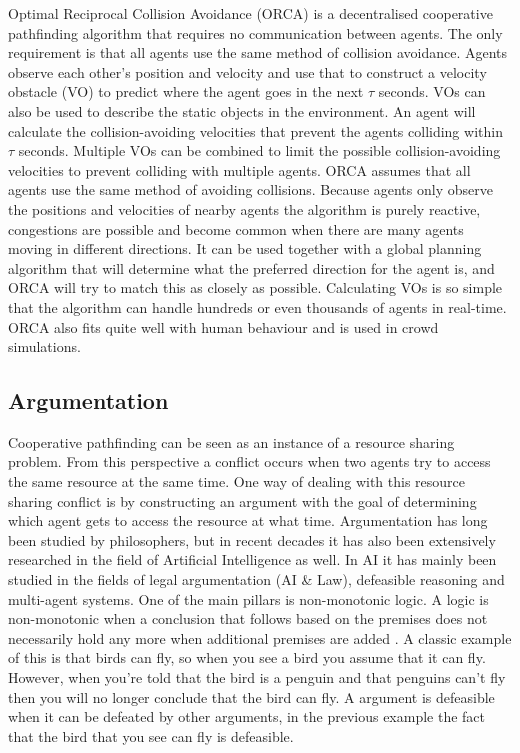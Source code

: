 Optimal Reciprocal Collision Avoidance (ORCA) \cite{vandenberg2011} is a
decentralised cooperative pathfinding algorithm that requires no communication
between agents. The only requirement is that all agents use the same method of
collision avoidance. Agents observe each other's position and velocity and use
that to construct a velocity obstacle (VO) to predict where the agent goes in
the next $\tau$ seconds. VOs can also be used to describe the static objects in
the environment. An agent will calculate the collision-avoiding velocities that
prevent the agents colliding within $\tau$ seconds. Multiple VOs can be
combined to limit the possible collision-avoiding velocities to prevent
colliding with multiple agents. ORCA assumes that all agents use the same
method of avoiding collisions. Because agents only observe the positions and
velocities of nearby agents the algorithm is purely reactive, congestions are
possible and become common when there are many agents moving in different
directions. It can be used together with a global planning algorithm that will
determine what the preferred direction for the agent is, and ORCA will try to
match this as closely as possible. Calculating VOs is so simple that the
algorithm can handle hundreds or even thousands of agents in real-time. ORCA
also fits quite well with human behaviour and is used in crowd simulations.

\subsection{Argumentation}
Cooperative pathfinding can be seen as an instance of a resource sharing
problem. From this perspective a conflict occurs when two agents try to access
the same resource at the same time. One way of dealing with this resource
sharing conflict is by constructing an argument with the goal of determining
which agent gets to access the resource at what time. Argumentation has long
been studied by philosophers, but in recent decades it has also been
extensively researched in
the field of Artificial Intelligence as well. In AI it has mainly been studied
in the fields of legal argumentation (AI \& Law), defeasible reasoning and
multi-agent systems. One of the main pillars is non-monotonic logic. A logic is
non-monotonic when a conclusion that follows based on the premises does not
necessarily hold any more when additional premises are added
\cite{vaneemeren2014}. A classic example of this is that birds can fly, so when
you see a bird you assume that it can fly. However, when you're told that the
bird is a penguin and that penguins can't fly then you will no longer conclude
that the bird can fly. A argument is defeasible when it can be defeated by
other arguments, in the previous example the fact that the bird that you see
can fly is defeasible.

